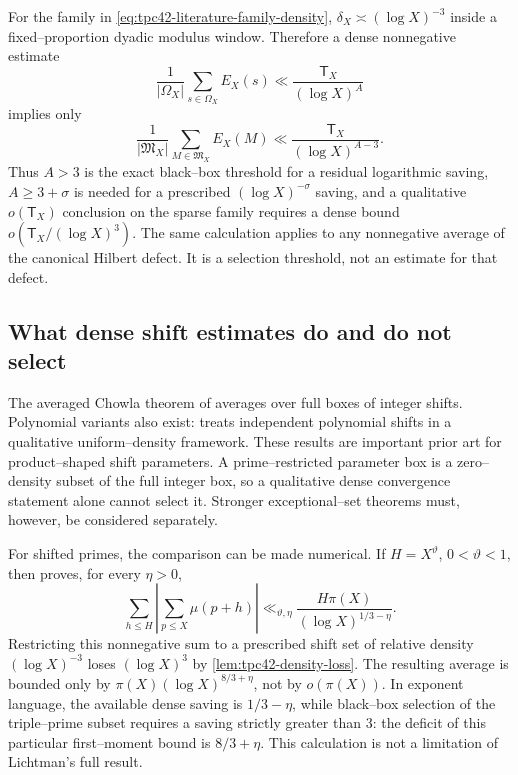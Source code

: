 For the family in \eqref{eq:tpc42-literature-family-density},
\(\delta_X\asymp(\log X)^{-3}\) inside a fixed--proportion dyadic modulus
window.  Therefore a dense nonnegative estimate
\begin{equation}
 \frac1{|\Omega_X|}\sum_{s\in\Omega_X}E_X(s)
 \ll \frac{\mathsf T_X}{(\log X)^A}
 \label{eq:tpc42-dense-average-saving}
\end{equation}
implies only
\begin{equation}
 \frac1{|\mathfrak M_X|}\sum_{M\in\mathfrak M_X}E_X(M)
 \ll \frac{\mathsf T_X}{(\log X)^{A-3}}.
 \label{eq:tpc42-triple-family-threshold}
\end{equation}
Thus \(A>3\) is the exact black--box threshold for a residual logarithmic
saving, \(A\ge3+\sigma\) is needed for a prescribed
\((\log X)^{-\sigma}\) saving, and a qualitative
\(o(\mathsf T_X)\) conclusion on the sparse family requires a dense bound
\(o(\mathsf T_X/(\log X)^3)\).
The same calculation applies to any nonnegative average of the canonical
Hilbert defect.  It is a selection threshold, not an estimate for that
defect.

\subsection{What dense shift estimates do and do not select}

The averaged Chowla theorem of
\citet{MatomakiRadziwillTao2015} averages over full boxes of integer
shifts.  Polynomial variants also exist: \citet{Frantzikinakis2018}
treats independent polynomial shifts in a qualitative uniform--density
framework.  These results are important prior art for product--shaped
shift parameters.  A prime--restricted parameter box is a zero--density
subset of the full integer box, so a qualitative dense convergence
statement alone cannot select it.  Stronger exceptional--set theorems
must, however, be considered separately.

For shifted primes, the comparison can be made numerical.  If
\(H=X^{\vartheta}\), \(0<\vartheta<1\), then
\citet[Theorem~1.1]{Lichtman2022} proves, for every \(\eta>0\),
\begin{equation}
 \sum_{h\le H}
 \left|\sum_{p\le X}\mu(p+h)\right|
 \ll_{\vartheta,\eta}
 \frac{H\pi(X)}{(\log X)^{1/3-\eta}}.
 \label{eq:tpc42-lichtman-dense-saving}
\end{equation}
Restricting this nonnegative sum to a prescribed shift set of relative
density \((\log X)^{-3}\) loses \((\log X)^3\) by
\cref{lem:tpc42-density-loss}.  The resulting average is bounded only by
\(\pi(X)(\log X)^{8/3+\eta}\), not by \(o(\pi(X))\).  In exponent language,
the available dense saving is \(1/3-\eta\), while black--box selection of
the triple--prime subset requires a saving strictly greater than \(3\):
the deficit of this particular first--moment bound is \(8/3+\eta\).
This calculation is not a limitation of Lichtman's full result.

